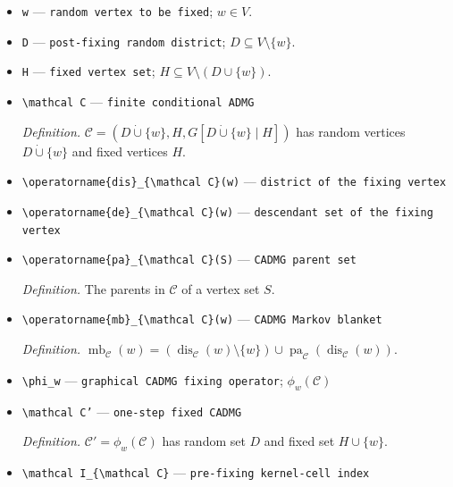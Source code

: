 \documentclass{article}
\begin{document}
\begin{itemize}
  \item \texttt{w} --- \texttt{random vertex to be fixed}; \(w\in V\).
  \item \texttt{D} --- \texttt{post-\allowbreak{}fixing random district}; \(D\subseteq V\setminus\{w\}\).
  \item \texttt{H} --- \texttt{fixed vertex set}; \(H\subseteq V\setminus(D\cup\{w\})\).
  \item \texttt{\textbackslash{}\allowbreak{}mathcal C} --- \texttt{finite conditional ADMG}
  \par\smallskip\noindent\emph{Definition.} \(\mathcal C=(D\mathbin{\dot\cup}\{w\},H,G[D\mathbin{\dot\cup}\{w\}\mid H])\) has random vertices \(D\mathbin{\dot\cup}\{w\}\) and fixed vertices \(H\).
  \item \texttt{\textbackslash{}\allowbreak{}operatorname\{dis\}\allowbreak{}\_\allowbreak{}\{\textbackslash{}\allowbreak{}mathcal C\}\allowbreak{}(w)} --- \texttt{district of the fixing vertex}
  \item \texttt{\textbackslash{}\allowbreak{}operatorname\{de\}\allowbreak{}\_\allowbreak{}\{\textbackslash{}\allowbreak{}mathcal C\}\allowbreak{}(w)} --- \texttt{descendant set of the fixing vertex}
  \item \texttt{\textbackslash{}\allowbreak{}operatorname\{pa\}\allowbreak{}\_\allowbreak{}\{\textbackslash{}\allowbreak{}mathcal C\}\allowbreak{}(S)} --- \texttt{CADMG parent set}
  \par\smallskip\noindent\emph{Definition.} The parents in \(\mathcal C\) of a vertex set \(S\).
  \item \texttt{\textbackslash{}\allowbreak{}operatorname\{mb\}\allowbreak{}\_\allowbreak{}\{\textbackslash{}\allowbreak{}mathcal C\}\allowbreak{}(w)} --- \texttt{CADMG Markov blanket}
  \par\smallskip\noindent\emph{Definition.} \(\operatorname{mb}_{\mathcal C}(w)=(\operatorname{dis}_{\mathcal C}(w)\setminus\{w\})\cup\operatorname{pa}_{\mathcal C}(\operatorname{dis}_{\mathcal C}(w))\).
  \item \texttt{\textbackslash{}\allowbreak{}phi\_\allowbreak{}w} --- \texttt{graphical CADMG fixing operator}; \(\phi_w(\mathcal C)\)
  \item \texttt{\textbackslash{}\allowbreak{}mathcal C'} --- \texttt{one-\allowbreak{}step fixed CADMG}
  \par\smallskip\noindent\emph{Definition.} \(\mathcal C'=\phi_w(\mathcal C)\) has random set \(D\) and fixed set \(H\cup\{w\}\).
  \item \texttt{\textbackslash{}\allowbreak{}mathcal I\_\allowbreak{}\{\textbackslash{}\allowbreak{}mathcal C\}\allowbreak{}} --- \texttt{pre-\allowbreak{}fixing kernel-\allowbreak{}cell index}

\end{itemize}
\end{document}
